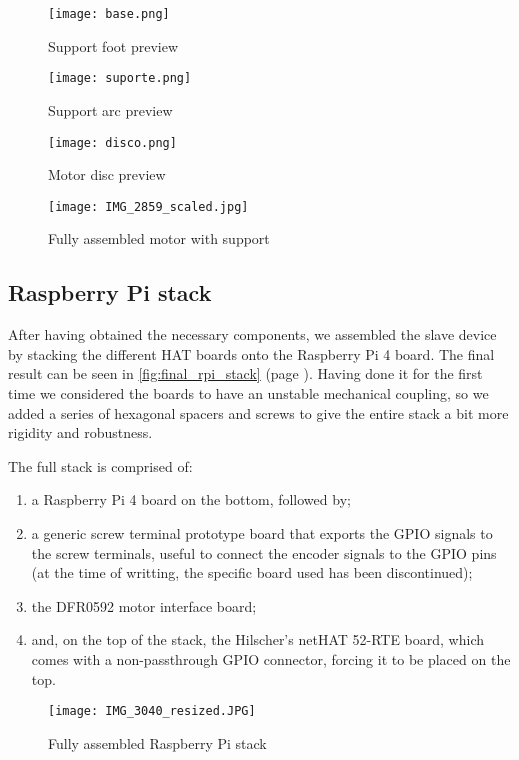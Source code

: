 \begin{figure}[htp]
	\centering
	\texttt{[image: base.png]}
	\caption{Support foot preview}
	\label{fig:support_base}
\end{figure}
\begin{figure}[htp]
	\centering
	\texttt{[image: suporte.png]}
	\caption{Support arc preview}
	\label{fig:support_arc}
\end{figure}
\begin{figure}[htp]
	\centering
	\texttt{[image: disco.png]}
	\caption{Motor disc preview}
	\label{fig:support_disc}
\end{figure}
\begin{figure}[htp]
	\centering
	\texttt{[image: IMG\_2859\_scaled.jpg]}
	\caption{Fully assembled motor with support}
	\label{fig:final_motor_stage}
\end{figure}

\subsection{Raspberry Pi stack}

After having obtained the necessary components, we assembled the slave device by stacking the different HAT boards onto the Raspberry Pi 4 board.
The final result can be seen in \autoref{fig:final_rpi_stack} (page \pageref{fig:final_rpi_stack}).
Having done it for the first time we considered the boards to have an unstable mechanical coupling, so we added a series of hexagonal spacers and screws to give the entire stack a bit more rigidity and robustness.

The full stack is comprised of:
\begin{enumerate}
	\item a Raspberry Pi 4 board \cite{product:rpi4} on the bottom, followed by;
	\item a generic screw terminal prototype board that exports the GPIO signals to the screw terminals, useful to connect the encoder signals to the GPIO pins (at the time of writting, the specific board used has been discontinued);
	\item the DFR0592 motor interface board;
	\item and, on the top of the stack, the Hilscher's netHAT 52-RTE board, which comes with a non-passthrough GPIO connector, forcing it to be placed on the top.
\end{enumerate}

\begin{figure}[htp]
	\centering
	\texttt{[image: IMG\_3040\_resized.JPG]}
	\caption{Fully assembled Raspberry Pi stack}
	\label{fig:final_rpi_stack}
\end{figure}

